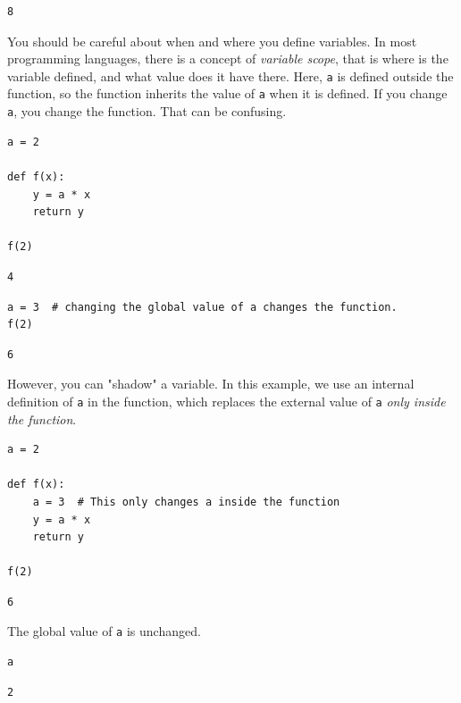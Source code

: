 \documentclass[11pt]{article}
\begin{document}
\begin{verbatim}
8
\end{verbatim}

You should be careful about when and where you define variables. In most programming languages, there is a concept of \emph{variable scope}, that is where is the variable defined, and what value does it have there. Here, \texttt{a} is defined outside the function, so the function inherits the value of \texttt{a} when it is defined. If you change \texttt{a}, you change the function. That can be confusing.

\begin{verbatim}
a = 2

def f(x):
    y = a * x
    return y

f(2)
\end{verbatim}

\begin{verbatim}
4
\end{verbatim}

\begin{verbatim}
a = 3  # changing the global value of a changes the function.
f(2)
\end{verbatim}

\begin{verbatim}
6
\end{verbatim}

However, you can "shadow" a variable. In this example, we use an internal definition of \texttt{a} in the function, which replaces the external value of \texttt{a} \emph{only inside the function}.

\begin{verbatim}
a = 2

def f(x):
    a = 3  # This only changes a inside the function
    y = a * x
    return y

f(2)
\end{verbatim}

\begin{verbatim}
6
\end{verbatim}

The global value of \texttt{a} is unchanged.

\begin{verbatim}
a
\end{verbatim}

\begin{verbatim}
2
\end{verbatim}
\end{document}
